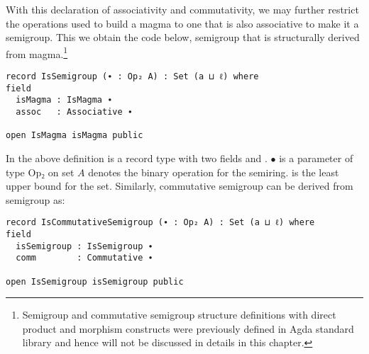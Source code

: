 With this declaration of associativity and commutativity, we may further
restrict the operations used to build a magma to one that is also associative to
make it a semigroup. This we obtain the code below, semigroup that is
structurally derived from magma.\footnote{Semigroup and commutative semigroup structure definitions with direct product
and morphism constructs were previously defined in Agda standard library and
hence will not be discussed in details in this chapter.}

\begin{verbatim}
record IsSemigroup (∙ : Op₂ A) : Set (a ⊔ ℓ) where
field
  isMagma : IsMagma ∙
  assoc   : Associative ∙

open IsMagma isMagma public
\end{verbatim}
In the above definition  is a record type with two fields
 and . $∙$ is a parameter of type Op₂ on set $A$
denotes the binary operation for the semiring.  is the least upper
bound for the set. Similarly, commutative semigroup can be derived from
semigroup as:
\begin{verbatim}
record IsCommutativeSemigroup (∙ : Op₂ A) : Set (a ⊔ ℓ) where
field
  isSemigroup : IsSemigroup ∙
  comm        : Commutative ∙

open IsSemigroup isSemigroup public
\end{verbatim}

